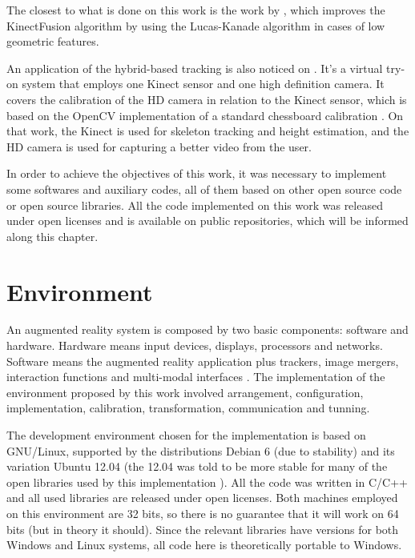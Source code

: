 \documentclass[msc, a4paper, classic, en]{ufbathesis}
\begin{document}
The closest to what is done on this work is the work by \cite{kinectkanade}, which improves the KinectFusion algorithm by using the Lucas-Kanade algorithm in cases of low geometric features.

An application of the hybrid-based tracking is also noticed on \cite{tryon}. It's a virtual try-on system that employs one Kinect sensor and one high definition camera. It covers the calibration of the HD camera in relation to the Kinect sensor, which is based on the OpenCV implementation of a standard chessboard calibration \cite{matlab}. On that work, the Kinect is used for skeleton tracking and height estimation, and the HD camera is used for capturing a better video from the user.


In order to achieve the objectives of this work, it was necessary to implement some softwares and auxiliary codes, all of them based on other open source code or open source libraries. All the code implemented on this work was released under open licenses and is available on public repositories, which will be informed along this chapter.

\section{Environment}
\label{sec:env}

An augmented reality system is composed by two basic components: software and hardware. Hardware means input devices, displays, processors and networks. Software means the augmented reality application plus trackers, image mergers, interaction functions and multi-modal interfaces \cite{tori2006fundamentos}. The implementation of the environment proposed by this work involved arrangement, configuration, implementation, calibration, transformation, communication and tunning.

The development environment chosen for the implementation is based on GNU/Linux, supported by the distributions Debian 6 (due to stability) and its variation Ubuntu 12.04 (the 12.04 was told to be more stable for many of the open libraries used by this implementation \cite{pcl14}). All the code was written in C/C++ and all used libraries are released under open licenses. Both machines employed on this environment are 32 bits, so there is no guarantee that it will work on 64 bits (but in theory it should). Since the relevant libraries have versions for both Windows and Linux systems, all code here is theoretically portable to Windows.
\end{document}
